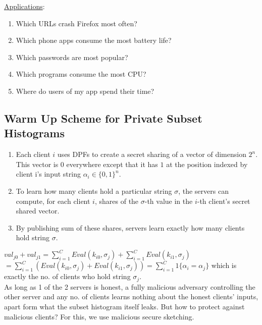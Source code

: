 \noindent \underline{Applications}:
\begin{enumerate}
   \item Which URLs crash Firefox most often? 
   \item Which phone apps consume the most battery life?
   \item Which passwords are most popular?
   \item Which programs consume the most CPU?
   \item Where do users of my app spend their time?
\end{enumerate}

\subsection{Warm Up Scheme for Private Subset Histograms}
\begin{enumerate}
    \item Each client $i$ uses DPFs to create a secret sharing of a vector of dimension $2^n$. This vector is 0 everywhere except that it has $1$ at the position indexed by client i's input string $\alpha_i \in \{0, 1\}^n$.
    \item To learn how many clients hold a particular string $\sigma$, the servers can compute, for each client $i$, shares of the $\sigma$-th value in the $i$-th client's secret shared vector.
    \item By publishing sum of these shares, servers learn exactly how many clients hold string $\sigma$.
\end{enumerate}

$val_{j0} + val_{j1} = \sum_{i=1}^C Eval(k_{i0}, \sigma_j) +  \sum_{i=1}^C Eval(k_{i1}, \sigma_j)$ \\
$= \sum_{i=1}^C (Eval(k_{i0}, \sigma_j) +  Eval(k_{i1}, \sigma_j)) = \sum_{i=1}^C 1\{\alpha_i = \alpha_j\}$ which is exactly the no. of clients who hold string $\sigma_j$. \\

As long as 1 of the 2 servers is honest, a fully malicious adversary controlling the other server and any no. of clients learns nothing about the honest clients' inputs, apart form what the subset histogram itself leaks. But how to protect against malicious clients? For this, we use malicious secure sketching.



